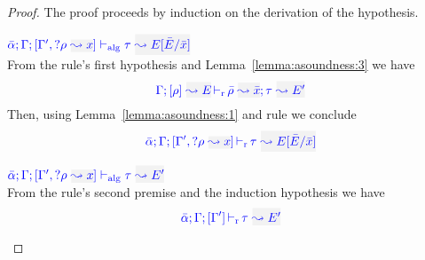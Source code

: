 \begin{proof}
The proof proceeds by induction on the derivation of the hypothesis.
\begin{description}
\setlength{\itemsep}{1em}
\item[\fbox{\rref{Alg-L-RuleMatch}}]\quad$\adlres{\bar\alpha}{\tenv}{\tenv',\envi{\rulet}{x}}{\type}{E[\bar{E}/\bar{x}]}$\ \\

From the rule's first hypothesis and Lemma~\ref{lemma:asoundness:3} we have
\begin{equation*}
\dmres{\tenv}{\rulet}{E}{\type}{E'}{\ie{\ruleset}{\bar{x}}}
\end{equation*}
Then, using Lemma~\ref{lemma:asoundness:1} and rule  we conclude
\begin{equation*}
\dlres{\bar\alpha}{\tenv}{\tenv',\envi{\rulet}{x}}{\type}{E[\bar{E}/\bar{x}]}
\end{equation*}

\item[\fbox{\rref{Alg-L-RuleNoMatch}}]\quad
$\adlres{\bar\alpha}{\tenv}{\tenv',\envi{\rulet}{x}}{\type}{E'}$\ \\

  From the rule's second premise and the induction hypothesis we have
\begin{equation*}
  \dlres{\bar\alpha}{\tenv}{\tenv'}{\type}{E'}
\end{equation*}


\end{description}
\end{proof}
